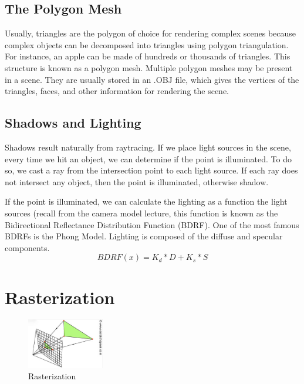 \documentclass{article}
\begin{document}
\subsection{The Polygon Mesh}
Usually, triangles are the polygon of choice for rendering complex scenes because complex objects can be decomposed into triangles using polygon triangulation. For instance, an apple can be made of hundreds or thousands of triangles. This structure is known as a polygon mesh. Multiple polygon meshes may be present in a scene. They are usually stored in an .OBJ file, which gives the vertices of the triangles, faces, and other information for rendering the scene.

\subsection{Shadows and Lighting}
Shadows result naturally from raytracing. If we place light sources in the scene, every time we hit an object, we can determine if the point is illuminated. To do so, we cast a ray from the intersection point to each light source. If each ray does not intersect any object, then the point is illuminated, otherwise shadow.

If the point is illuminated, we can calculate the lighting as a function the light sources (recall from the camera model lecture, this function is known as the Bidirectional Reflectance Distribution Function (BDRF). One of the most famous BDRFs is the Phong Model. Lighting is composed of the diffuse and specular components.
$$ BDRF(x) = K_d*D + K_s*S$$

\newpage

\begin{figure}[!htbp]
 \centering
\end{figure}

\section{Rasterization}

\begin{figure}
  \vspace{-25pt}
  \begin{center}
    \includegraphics[width=0.3\textwidth]{rasterization.png}
  \end{center}
  \caption{Rasterization}
  \label{rasterization}
  \vspace{-00pt}
\end{figure}
\end{document}
